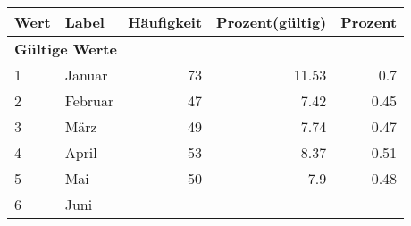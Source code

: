      \begin{longtable}{lXrrr}
     \toprule
     \textbf{Wert} & \textbf{Label} & \textbf{Häufigkeit} & \textbf{Prozent(gültig)} & \textbf{Prozent} \\
     \endhead
     \midrule
     \multicolumn{5}{l}{\textbf{Gültige Werte}}\\

     1 &
     \multicolumn{1}{X}{ Januar   } &


       \num{73} &
       \num[round-mode=places,round-precision=2]{11.53} &
         \num[round-mode=places,round-precision=2]{0.7} \\

     2 &
     \multicolumn{1}{X}{ Februar   } &


       \num{47} &
       \num[round-mode=places,round-precision=2]{7.42} &
         \num[round-mode=places,round-precision=2]{0.45} \\

     3 &
     \multicolumn{1}{X}{ März   } &


       \num{49} &
       \num[round-mode=places,round-precision=2]{7.74} &
         \num[round-mode=places,round-precision=2]{0.47} \\

     4 &
     \multicolumn{1}{X}{ April   } &


       \num{53} &
       \num[round-mode=places,round-precision=2]{8.37} &
         \num[round-mode=places,round-precision=2]{0.51} \\

     5 &
     \multicolumn{1}{X}{ Mai   } &


       \num{50} &
       \num[round-mode=places,round-precision=2]{7.9} &
         \num[round-mode=places,round-precision=2]{0.48} \\

     6 &
     \multicolumn{1}{X}{ Juni   } &



\end{longtable}
